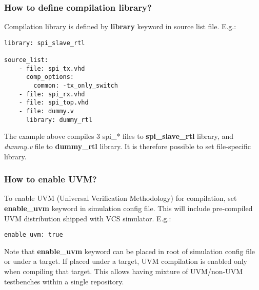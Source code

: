 \documentclass{tropic_design_spec}
\begin{document}
\subsubsection{How to define compilation library?}
\label{sec:how-to-define-compilation-library}

Compilation library is defined by \textbf{library} keyword in source list file. E.g.:

\begin{lstlisting}
library: spi_slave_rtl

source_list:
    - file: spi_tx.vhd
      comp_options:
        common: -tx_only_switch
    - file: spi_rx.vhd
    - file: spi_top.vhd
    - file: dummy.v
      library: dummy_rtl
\end{lstlisting}

The example above compiles 3 spi_* files to \textbf{spi_slave_rtl} library, and
\textit{dummy.v} file to \textbf{dummy_rtl} library. It is therefore possible to
set file-specific library.



\subsubsection{How to enable UVM?}
\label{sec:how-to-enable-uvm}

To enable UVM (Universal Verification Methodology) for compilation, set \textbf{enable_uvm}
keyword in simulation config file. This will include pre-compiled UVM distribution shipped
with VCS simulator. E.g.:

\begin{lstlisting}
enable_uvm: true
\end{lstlisting}

Note that \textbf{enable_uvm} keyword can be placed in root of simulation config file
or under a target. If placed under a target, UVM compilation is enabled only when
compiling that target. This allows having mixture of UVM/non-UVM testbenches within a
single repository.


\end{document}
